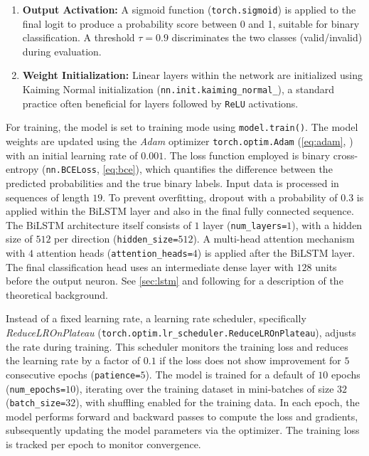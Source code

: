 \begin{enumerate}
  \item \textbf{Output Activation:} A sigmoid function (\texttt{torch.sigmoid}) is applied to the final logit to produce a probability score between 0 and 1, suitable for binary classification. A threshold $\tau = 0.9$ discriminates the two classes (valid/invalid) during evaluation.

  \item \textbf{Weight Initialization:} Linear layers within the network are initialized using Kaiming Normal initialization (\texttt{nn.init.kaiming\_normal\_}), a standard practice often beneficial for layers followed by \texttt{ReLU} activations.
\end{enumerate}

For training, the model is set to training mode using \texttt{model.train()}. The model weights are updated using the \textit{Adam} optimizer \texttt{torch.optim.Adam} (\autoref{eq:adam}, \autocite{kingma2014adam}) with an initial learning rate of $0.001$. The loss function employed is binary cross-entropy (\texttt{nn.BCELoss}, \autoref{eq:bce}), which quantifies the difference between the predicted probabilities and the true binary labels. Input data is processed in sequences of length $19$. To prevent overfitting, dropout with a probability of $0.3$ is applied within the BiLSTM layer and also in the final fully connected sequence. The BiLSTM architecture itself consists of $1$ layer (\texttt{num\_layers=$1$}), with a hidden size of $512$ per direction (\texttt{hidden\_size=$512$}). A multi-head attention mechanism with $4$ attention heads (\texttt{attention\_heads=$4$}) is applied after the BiLSTM layer. The final classification head uses an intermediate dense layer with $128$ units before the output neuron. See \autoref{sec:lstm} and following for a description of the theoretical background.

Instead of a fixed learning rate, a learning rate scheduler, specifically \textit{ReduceLROnPlateau} (\texttt{torch.optim.lr\_scheduler.ReduceLROnPlateau}), adjusts the rate during training. This scheduler monitors the training loss and reduces the learning rate by a factor of $0.1$ if the loss does not show improvement for $5$ consecutive epochs (\texttt{patience=$5$}). The model is trained for a default of $10$ epochs (\texttt{num\_epochs=$10$}), iterating over the training dataset in mini-batches of size $32$ (\texttt{batch\_size=$32$}), with shuffling enabled for the training data. In each epoch, the model performs forward and backward passes to compute the loss and gradients, subsequently updating the model parameters via the optimizer. The training loss is tracked per epoch to monitor convergence.

